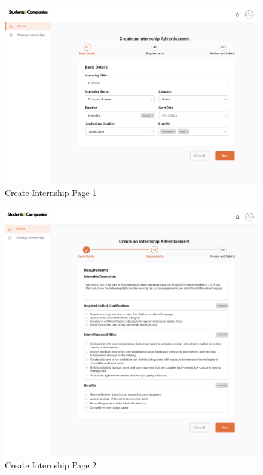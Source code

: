 \documentclass{article}
\begin{document}
\begin{figure}[H]
    \centering
    \includegraphics[scale = 0.42]{figures/UserInterfaces/Company/CreateInternship1.png}
    \caption{Create Internship Page 1}
     \centering
\end{figure}
\begin{figure}[H]
    \centering
    \includegraphics[scale = 0.40]{figures/UserInterfaces/Company/CreateInternship2.png}
    \caption{Create Internship Page 2}
     \centering
\end{figure}
\end{document}
